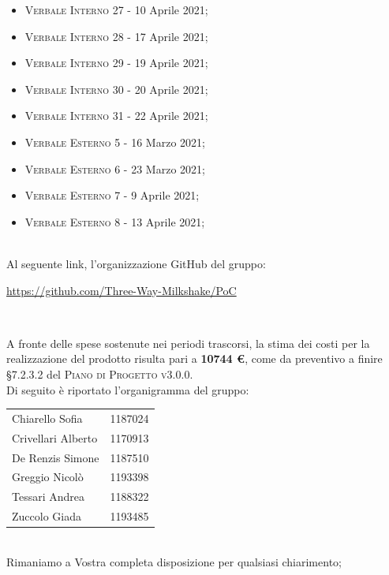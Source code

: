 \documentclass[10pt,stdletter,dateno,sigright]{newlfm}  %
\begin{document}
\begin{newlfm}
\begin{multicols}{2}
\begin{itemize}
            \item \textsc{Verbale Interno 27} - 10 Aprile 2021;
            \item \textsc{Verbale Interno 28} - 17 Aprile 2021;
            \item \textsc{Verbale Interno 29} - 19 Aprile 2021;
            \item \textsc{Verbale Interno 30} - 20 Aprile 2021;
            \item \textsc{Verbale Interno 31} - 22 Aprile 2021;
            \item \textsc{Verbale Esterno 5} - 16 Marzo 2021;
            \item \textsc{Verbale Esterno 6} - 23 Marzo 2021;
            \item \textsc{Verbale Esterno 7} - 9 Aprile 2021;
            \item \textsc{Verbale Esterno 8} - 13 Aprile 2021;
        \end{itemize}
    \end{multicols}

	
		\ \\
		
		Al seguente link, l'organizzazione GitHub del gruppo:
		\begin{center}
			\url{https://github.com/Three-Way-Milkshake/PoC}
		\end{center}
		\
		
        A fronte delle spese sostenute nei periodi trascorsi, la stima dei costi per la realizzazione del prodotto risulta pari a \textbf{10744 \euro}, come da preventivo a finire \S 7.2.3.2 del \textsc{Piano di Progetto v3.0.0}.
        \\

        Di seguito \`e riportato l'organigramma del gruppo:
        \begin{center}
            \begin{tabular}{l | l}
                Chiarello Sofia & 1187024
                \\
                Crivellari Alberto & 1170913
                \\
                De Renzis Simone & 1187510
                \\
                Greggio Nicolò & 1193398
                \\
                Tessari Andrea & 1188322
                \\
                Zuccolo Giada & 1193485
                \\
            \end{tabular}
        \end{center}
        \ \newline
        \\Rimaniamo a Vostra completa disposizione per qualsiasi chiarimento;

    \end{newlfm}
\end{document}
